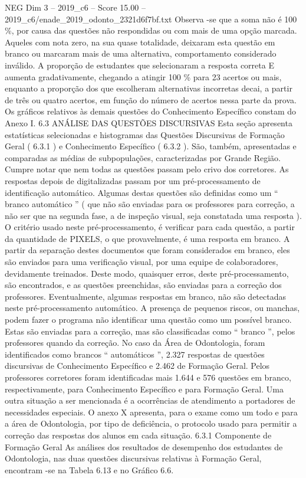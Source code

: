 \begin{textsample}{NEG Dim 3 – 2019\_c6 – Score 15.00 – 2019\_c6/enade\_2019\_odonto\_2321d6f7bf.txt}
Observa -se que a soma não é 100 \%, por causa das questões não respondidas ou com mais de uma opção marcada.
Aqueles com nota zero, na sua quase totalidade, deixaram esta questão em branco ou marcaram mais de uma alternativa, comportamento considerado inválido.
A proporção de estudantes que selecionaram a resposta correta E aumenta gradativamente, chegando a atingir 100 \% para 23 acertos ou mais, enquanto a proporção dos que escolheram alternativas incorretas decai, a partir de três ou quatro acertos, em função do número de acertos nessa parte da prova.
Os gráficos relativos às demais questões do Conhecimento Específico constam do Anexo I. 6.3 ANÁLISE DAS QUESTÕES DISCURSIVAS Esta seção apresenta estatísticas selecionadas e histogramas das Questões Discursivas de Formação Geral ( 6.3.1 ) e Conhecimento Específico ( 6.3.2 ).
São, também, apresentadas e comparadas as médias de subpopulações, caracterizadas por Grande Região.
Cumpre notar que nem todas as questões passam pelo crivo dos corretores.
As respostas depois de digitalizadas passam por um pré-processamento de identificação automático.
Algumas destas questões são definidas como um “ branco automático ” ( que não são enviadas para os professores para correção, a não ser que na segunda fase, a de inspeção visual, seja constatada uma resposta ).
O critério usado neste pré-processamento, é verificar para cada questão, a partir da quantidade de PIXELS, o que provavelmente, é uma resposta em branco.
A partir da separação destes documentos que foram considerados em branco, eles são enviados para uma verificação visual, por uma equipe de colaboradores, devidamente treinados.
Deste modo, quaisquer erros, deste pré-processamento, são encontrados, e as questões preenchidas, são enviadas para a correção dos professores.
Eventualmente, algumas respostas em branco, não são detectadas neste pré-processamento automático.
A presença de pequenos riscos, ou manchas, podem fazer o programa não identificar uma questão como um possível branco.
Estas são enviadas para a correção, mas são classificadas como “ branco ”, pelos professores quando da correção.
No caso da Área de Odontologia, foram identificados como brancos “ automáticos ”, 2.327 respostas de questões discursivas de Conhecimento Específico e 2.462 de Formação Geral.
Pelos professores corretores foram identificadas mais 1.644 e 576 questões em branco, respectivamente, para Conhecimento Específico e para Formação Geral.
Uma outra situação a ser mencionada é a ocorrências de atendimento a portadores de necessidades especiais.
O anexo X apresenta, para o exame como um todo e para a área de Odontologia, por tipo de deficiência, o protocolo usado para permitir a correção das respostas dos alunos em cada situação. 6.3.1 Componente de Formação Geral As análises dos resultados de desempenho dos estudantes de Odontologia, nas duas questões discursivas relativas à Formação Geral, encontram -se na Tabela 6.13 e no Gráfico 6.6.

\end{textsample}
